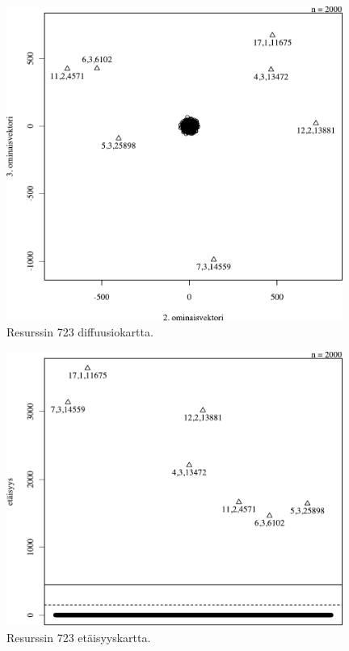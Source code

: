 \begin{figure}[p]
\centering
\includegraphics[width=11cm]{pics/diffuusiokuvat/service_723.pdf}
\caption{Resurssin 723 diffuusiokartta.}
\label{diffusio_723}
\end{figure}

\begin{figure}[p]
\centering
\includegraphics[width=11cm]{pics/tiheyskuvat/service_723.pdf}
\caption{Resurssin 723 etäisyyskartta.}
\label{service_723}
\end{figure}

